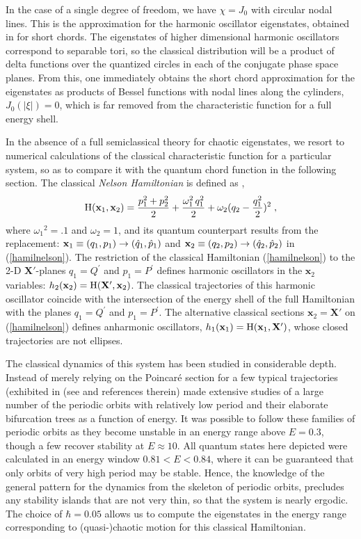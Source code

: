 \documentclass[12pt]{iopart}
\newcommand{\x}{{\mathbf x}}
\newcommand{\X}{{\mathbf X}}
\begin{document}
In the case of a single degree of freedom, we have $\chi = J_0$ with circular nodal lines.
This is the approximation for the harmonic oscillator eigenstates, obtained in \cite{OVS}
for short chords. The eigenstates of higher dimensional harmonic oscillators correspond
to separable tori, so the classical distribution will be a product of delta functions
over the quantized circles in each of the conjugate phase space planes.  
From this, one immediately obtains the short chord approximation for the eigenstates
as products of Bessel functions with nodal lines along the cylinders, $J_0(|\xi|)=0$,
which is far removed from the characteristic function for a full energy shell.

In the absence of a full semiclassical theory for chaotic eigenstates,
we resort to numerical calculations of the classical characteristic function for a particular system,
so as to compare it with the quantum chord function in the following section.
The classical {\it Nelson Hamiltonian} is defined as \cite{BarDav},
\begin{equation}
\label{hamilnelson}
\mbox{H}({\bf x}_1,{\bf x}_2)=
\frac{p_1^2+p_2^2}{2} + \frac{\omega_1^2\,q_1^2}{2}+\omega_2(q_2-\frac{q_1^2}{2})^2
\;,
\end{equation} 
where ${\omega_1}^2= .1$ and $\omega_2= 1$,
and its quantum counterpart results from the replacement: 
${\bf x}_1\equiv(q_1,p_1)\rightarrow (\hat{q}_1,\hat{p}_1)$ and
${\bf x}_2\equiv(q_2,p_2)\rightarrow (\hat{q}_2,\hat{p}_2)$ in (\ref{hamilnelson}).
The restriction of the  classical Hamiltonian (\ref{hamilnelson}) 
to the 2-D $\X'$-planes $q_1=Q^{'}$ and $p_1=P^{'}$
defines harmonic oscillators in the $\x_2$ variables: 
$h_2(\x_2)=\mbox{H}(\X',{\bf x}_2)$. 
The classical trajectories of this harmonic oscillator
coincide with the intersection of the energy shell of the full Hamiltonian 
with the planes $q_1=Q^{'}$ and $p_1=P^{'}$.
The alternative classical sections $\x_2=\X'$ on (\ref{hamilnelson}) defines
anharmonic oscillators, $h_1(\x_1)=\mbox{H}({\bf x}_1,\X')$, 
whose closed trajectories are not ellipses.  

The classical dynamics of this system has been studied in considerable depth.
Instead of merely relying on the Poincar\'e section for a few typical trajectories
(exhibited in \cite{BarDav, RibAg}
(see \cite{PradAg} and references therein)
made extensive studies of a large number of the periodic orbits 
with relatively low period and their elaborate bifurcation trees as a function of energy. 
It was possible to follow these families of periodic orbits as they
become unstable in an energy range above $E=0.3$, though a few recover 
stability at $E\approx 10$. All quantum states here depicted were calculated
in an energy window  $0. 81< E < 0.84$, 
where it can be guaranteed that only orbits of very high period
may be stable. Hence, the knowledge of the general pattern 
for the dynamics from the skeleton of periodic orbits,
precludes any stability islands that are not very thin, so that
the system is nearly ergodic. 
The choice of $\hbar=0.05$ allows us to compute the eigenstates
in the energy range corresponding to (quasi-)chaotic motion for this classical Hamiltonian.
\end{document}
